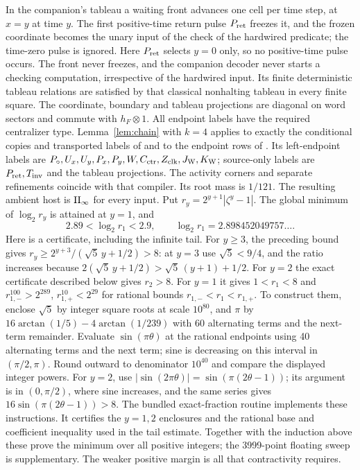 In the companion's tableau \cite[Sections 5.3 and 7]{Spatial} a waiting front advances one cell per time step, at $x=y$ at time $y$.
The first positive-time return pulse $P_{\rm ret}$ freezes it, and the frozen coordinate becomes the unary input of the check of the hardwired predicate; the time-zero pulse is ignored. Here $P_{\rm ret}$ selects $y=0$ only, so no positive-time pulse occurs. The front never freezes, and the companion decoder never starts a checking computation, irrespective of the hardwired input. Its finite deterministic tableau relations are
satisfied by that classical nonhalting tableau in every finite square.
The coordinate, boundary and tableau projections are diagonal on word
sectors and commute with $h_F\otimes1$.
All endpoint labels have the required centralizer type.
Lemma~\ref{lem:chain} with $k=4$ applies to exactly the conditional copies and transported labels of \cite[Section 4.4 and Lemma 4.4]{Spatial} and to the endpoint rows of \cite[Sections 5--7]{Spatial}.
Its left-endpoint labels are $P_\circ,U_x,U_y,P_x,P_y,W,C_{\rm ctr},
Z_{\rm clk},J_{\rm W},K_{\rm W}$; source-only labels are
$P_{\rm ret},T_{\rm inv}$ and the tableau projections. The activity
corners and separate refinements coincide with that compiler.
Its root mass is $1/121$.
The resulting ambient host is $\mathrm{II}_\infty$ for every input.
Put $r_y=2^{y+1}|\zeta^y-1|$. The global minimum of
$\log_2 r_y$ is attained at $y=1$, and
\begin{equation}\label{eq:margin}
 2.89<\log_2 r_1<2.9,\qquad
 \log_2 r_1=2.898452049757\ldots.
\end{equation}
Here is a certificate, including the infinite tail. For $y\geq3$,
the preceding bound gives
$r_y\geq2^{y+3}/(\sqrt5\,y+1/2)>8$: at $y=3$ use
$\sqrt5<9/4$, and the ratio increases because
$2(\sqrt5\,y+1/2)>\sqrt5\,(y+1)+1/2$.
For $y=2$ the exact certificate described below gives $r_2>8$.
For $y=1$ it gives $1<r_1<8$ and
$r_{1,-}^{100}>2^{289}$, $r_{1,+}^{10}<2^{29}$ for rational
bounds $r_{1,-}<r_1<r_{1,+}$.
To construct them, enclose $\sqrt5$ by integer square roots at scale
$10^{80}$, and $\pi$ by
$16\arctan(1/5)-4\arctan(1/239)$ with 60 alternating terms and
the next-term remainder. Evaluate $\sin(\pi\theta)$ at the
rational endpoints using 40 alternating terms and the next term;
sine is decreasing on this interval in $(\pi/2,\pi)$.
Round outward to denominator $10^{40}$ and compare the displayed
integer powers. For $y=2$, use
$|\sin(2\pi\theta)|=\sin(\pi(2\theta-1))$; its argument is in
$(0,\pi/2)$, where sine increases, and the same series gives
$16\sin(\pi(2\theta-1))>8$.
The bundled exact-fraction routine implements these instructions.
It certifies the $y=1,2$ enclosures and the rational base and
coefficient inequality used in the tail estimate. Together with
the induction above these prove the minimum over all positive
integers; the 3999-point floating sweep is supplementary.
The weaker positive margin is all that contractivity requires.

